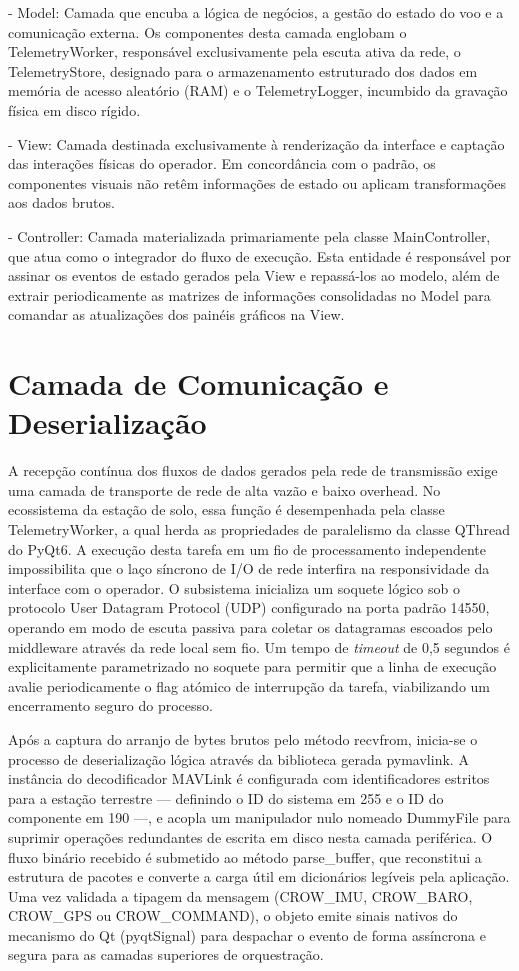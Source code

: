 - Model: Camada que encuba a lógica de negócios, a gestão do estado do voo e a comunicação externa. Os componentes desta camada englobam o TelemetryWorker, responsável exclusivamente pela escuta ativa da rede, o TelemetryStore, designado para o armazenamento estruturado dos dados em memória de acesso aleatório (RAM) e o TelemetryLogger, incumbido da gravação física em disco rígido.

- View: Camada destinada exclusivamente à renderização da interface e captação das interações físicas do operador. Em concordância com o padrão, os componentes visuais não retêm informações de estado ou aplicam transformações aos dados brutos.

- Controller: Camada materializada primariamente pela classe MainController, que atua como o integrador do fluxo de execução. Esta entidade é responsável por assinar os eventos de estado gerados pela View e repassá-los ao modelo, além de extrair periodicamente as matrizes de informações consolidadas no Model para comandar as atualizações dos painéis gráficos na View.


\section{Camada de Comunicação e Deserialização}
A recepção contínua dos fluxos de dados gerados pela rede de transmissão exige uma camada de transporte de rede de alta vazão e baixo overhead. No ecossistema da estação de solo, essa função é desempenhada pela classe TelemetryWorker, a qual herda as propriedades de paralelismo da classe QThread do PyQt6. A execução desta tarefa em um fio de processamento independente impossibilita que o laço síncrono de I/O de rede interfira na responsividade da interface com o operador. O subsistema inicializa um soquete lógico sob o protocolo User Datagram Protocol (UDP) configurado na porta padrão 14550, operando em modo de escuta passiva para coletar os datagramas escoados pelo middleware através da rede local sem fio. Um tempo de \textit{timeout} de 0,5 segundos é explicitamente parametrizado no soquete para permitir que a linha de execução avalie periodicamente o flag atómico de interrupção da tarefa, viabilizando um encerramento seguro do processo.

Após a captura do arranjo de bytes brutos pelo método recvfrom, inicia-se o processo de deserialização lógica através da biblioteca gerada pymavlink. A instância do decodificador MAVLink é configurada com identificadores estritos para a estação terrestre — definindo o ID do sistema em 255 e o ID do componente em 190 —, e acopla um manipulador nulo nomeado DummyFile para suprimir operações redundantes de escrita em disco nesta camada periférica. O fluxo binário recebido é submetido ao método parse\_buffer, que reconstitui a estrutura de pacotes e converte a carga útil em dicionários legíveis pela aplicação. Uma vez validada a tipagem da mensagem (CROW\_IMU, CROW\_BARO, CROW\_GPS ou CROW\_COMMAND), o objeto emite sinais nativos do mecanismo do Qt (pyqtSignal) para despachar o evento de forma assíncrona e segura para as camadas superiores de orquestração.

